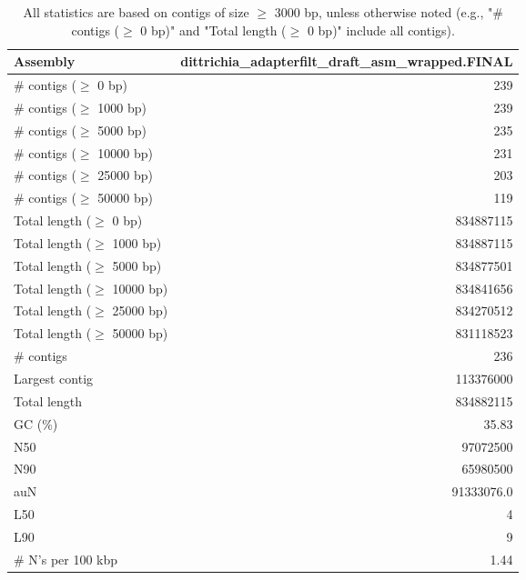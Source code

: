 \documentclass[12pt,a4paper]{article}
\begin{document}
\begin{table}[ht]
\begin{center}
\caption{All statistics are based on contigs of size $\geq$ 3000 bp, unless otherwise noted (e.g., "\# contigs ($\geq$ 0 bp)" and "Total length ($\geq$ 0 bp)" include all contigs).}
\begin{tabular}{|l*{1}{|r}|}
\hline
Assembly & dittrichia\_adapterfilt\_draft\_asm\_wrapped.FINAL \\ \hline
\# contigs ($\geq$ 0 bp) & 239 \\ \hline
\# contigs ($\geq$ 1000 bp) & 239 \\ \hline
\# contigs ($\geq$ 5000 bp) & 235 \\ \hline
\# contigs ($\geq$ 10000 bp) & 231 \\ \hline
\# contigs ($\geq$ 25000 bp) & 203 \\ \hline
\# contigs ($\geq$ 50000 bp) & 119 \\ \hline
Total length ($\geq$ 0 bp) & 834887115 \\ \hline
Total length ($\geq$ 1000 bp) & 834887115 \\ \hline
Total length ($\geq$ 5000 bp) & 834877501 \\ \hline
Total length ($\geq$ 10000 bp) & 834841656 \\ \hline
Total length ($\geq$ 25000 bp) & 834270512 \\ \hline
Total length ($\geq$ 50000 bp) & 831118523 \\ \hline
\# contigs & 236 \\ \hline
Largest contig & 113376000 \\ \hline
Total length & 834882115 \\ \hline
GC (\%) & 35.83 \\ \hline
N50 & 97072500 \\ \hline
N90 & 65980500 \\ \hline
auN & 91333076.0 \\ \hline
L50 & 4 \\ \hline
L90 & 9 \\ \hline
\# N's per 100 kbp & 1.44 \\ \hline
\end{tabular}
\end{center}
\end{table}
\end{document}
